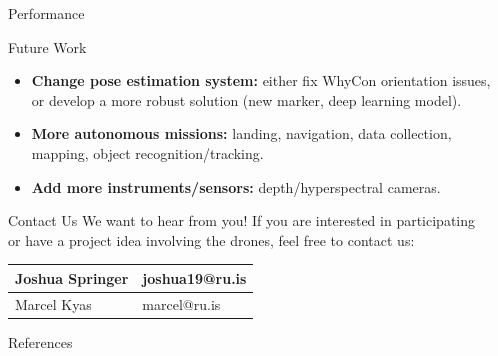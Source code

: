 \documentclass[final, 20pt]{beamer}
\newlength{\sepwidth}
\newlength{\colwidth}
\newcommand{\separatorcolumn}{\begin{column}{\sepwidth}\end{column}}
\begin{document}
\begin{frame}[t]
\begin{columns}[t]
\begin{column}{\colwidth}
\begin{alertblock}{Performance}
  \end{alertblock}

  \begin{block}{Future Work}

    \begin{itemize}
      \item \textbf{Change pose estimation system:} either fix WhyCon orientation issues, or develop a more robust solution (new marker, deep learning model).
      \item \textbf{More autonomous missions:} landing, navigation, data collection, mapping, object recognition/tracking.
      \item \textbf{Add more instruments/sensors:} depth/hyperspectral cameras.
    \end{itemize}

  \end{block}

  \begin{alertblock}{Contact Us}
    We want to hear from you!
    If you are interested in participating or have a project idea involving the drones, feel free to contact us:

    \begin{center}
      \begin{tabular}{|l|l|}
        \hline
        Joshua Springer & joshua19@ru.is\\\hline
        Marcel Kyas & marcel@ru.is\\\hline
    \end{tabular}
    \end{center}
  \end{alertblock}

  \begin{block}{References}
    \vspace{-0.5cm}
    
    \footnotesize{}

  \end{block}

\end{column}

\separatorcolumn
\end{columns}
\end{frame}
\end{document}
